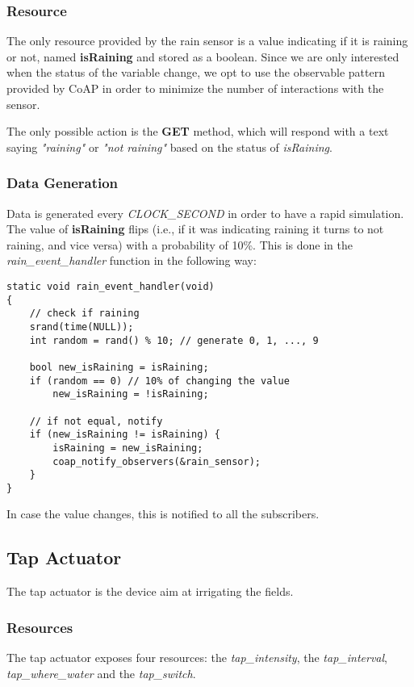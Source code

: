 \subsubsection{Resource}
The only resource provided by the rain sensor is a value indicating if it is raining or not, named \textbf{isRaining} and stored as a boolean. Since we are only interested when the status of the variable change, we opt to use the observable pattern provided by CoAP in order to minimize the number of interactions with the sensor.

The only possible action is the \textbf{GET} method, which will respond with a text saying \textit{"raining"} or \textit{"not raining"} based on the status of \textit{isRaining}.

\subsubsection{Data Generation}
Data is generated every \textit{CLOCK\_SECOND} in order to have a rapid simulation. The value of \textbf{isRaining} flips (i.e., if it was indicating raining it turns to not raining, and vice versa) with a probability of 10\%. This is done in the \textit{rain\_event\_handler} function in the following way:

\begin{lstlisting}
static void rain_event_handler(void)
{
    // check if raining
    srand(time(NULL));
    int random = rand() % 10; // generate 0, 1, ..., 9
    
    bool new_isRaining = isRaining;
    if (random == 0) // 10% of changing the value
        new_isRaining = !isRaining;

    // if not equal, notify
    if (new_isRaining != isRaining) {
        isRaining = new_isRaining;
        coap_notify_observers(&rain_sensor);
    }
}
\end{lstlisting}

In case the value changes, this is notified to all the subscribers.




\subsection{Tap Actuator}
The tap actuator is the device aim at irrigating the fields.

\subsubsection{Resources}
The tap actuator exposes four resources: the \textit{tap\_intensity}, the \textit{tap\_interval}, \textit{tap\_where\_water} and the \textit{tap\_switch}.

